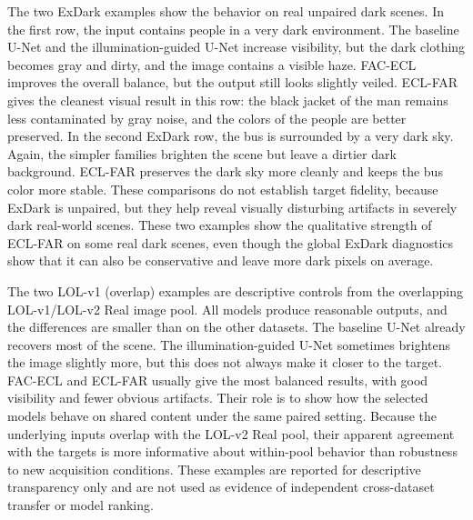 The two ExDark examples show the behavior on real unpaired dark scenes. In the first row, the input contains people in a very dark environment. The baseline U-Net and the illumination-guided U-Net increase visibility, but the dark clothing becomes gray and dirty, and the image contains a visible haze. FAC-ECL improves the overall balance, but the output still looks slightly veiled. ECL-FAR gives the cleanest visual result in this row: the black jacket of the man remains less contaminated by gray noise, and the colors of the people are better preserved. In the second ExDark row, the bus is surrounded by a very dark sky. Again, the simpler families brighten the scene but leave a dirtier dark background. ECL-FAR preserves the dark sky more cleanly and keeps the bus color more stable. These comparisons do not establish target fidelity, because ExDark is unpaired, but they help reveal visually disturbing artifacts in severely dark real-world scenes. These two examples show the qualitative strength of ECL-FAR on some real dark scenes, even though the global ExDark diagnostics show that it can also be conservative and leave more dark pixels on average.

The two LOL-v1 (overlap) examples are descriptive controls from the overlapping LOL-v1/LOL-v2 Real image pool. All models produce reasonable outputs, and the differences are smaller than on the other datasets. The baseline U-Net already recovers most of the scene. The illumination-guided U-Net sometimes brightens the image slightly more, but this does not always make it closer to the target. FAC-ECL and ECL-FAR usually give the most balanced results, with good visibility and fewer obvious artifacts. Their role is to show how the selected models behave on shared content under the same paired setting. Because the underlying inputs overlap with the LOL-v2 Real pool, their apparent agreement with the targets is more informative about within-pool behavior than robustness to new acquisition conditions. These examples are reported for descriptive transparency only and are not used as evidence of independent cross-dataset transfer or model ranking.

